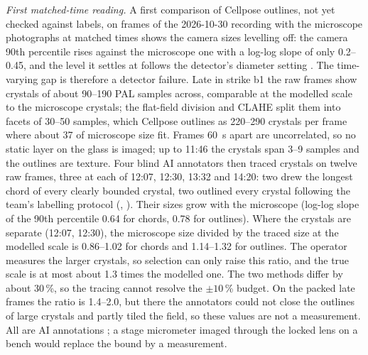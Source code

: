 \emph{First matched-time reading.} A first comparison of Cellpose outlines, not yet checked against labels, on
frames of the 2026-10-30 recording with the microscope photographs at matched times shows the camera sizes levelling
off: the camera 90th percentile rises against the microscope one with a log-log slope of only 0.2--0.45, and the
level it settles at follows the detector's diameter setting . The
time-varying gap is therefore a detector failure. Late in strike b1 the raw frames show crystals of about 90--190 PAL samples across,
comparable at the modelled scale to the microscope crystals; the flat-field division and CLAHE split them into facets
of 30--50 samples, which Cellpose outlines as 220--290 crystals per frame where about 37 of microscope size fit.
Frames 60~s apart are uncorrelated, so no static layer on the glass is imaged; up to 11:46 the crystals span 3--9
samples and the outlines are texture. Four blind AI annotators then traced crystals on twelve raw frames, three at
each of 12:07, 12:30, 13:32 and 14:20: two drew the longest chord of every clearly bounded crystal, two outlined
every crystal following the team's labelling protocol (,
). Their sizes grow with the microscope (log-log slope of the 90th
percentile 0.64 for chords, 0.78 for outlines). Where the crystals are separate (12:07, 12:30), the microscope size
divided by the traced size at the modelled scale is 0.86--1.02 for chords and 1.14--1.32 for outlines. The operator
measures the larger crystals, so selection can only raise this ratio, and the true scale is at most about 1.3 times
the modelled one. The two methods differ by about 30\,\%, so the tracing cannot resolve the $\pm 10$\,\% budget. On
the packed late frames the ratio is 1.4--2.0, but there the annotators could not close the outlines of large
crystals and partly tiled the field, so these values are not a measurement. All are AI annotations
; a stage micrometer imaged through the locked lens on a bench would
replace the bound by a measurement.
